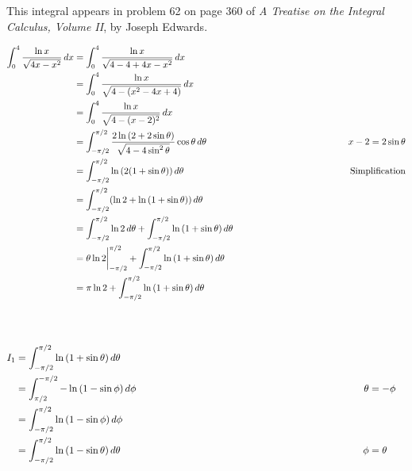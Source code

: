 \documentclass{article}
\newcommand{\explnspacei}{\hspace{1.59in}}		%
\newcommand{\explnspaceii}{\hspace{3.04in}}
\begin{document}
\noindent
This integral appears in problem 62 on page 360 of \textit{A Treatise on the Integral Calculus, Volume II}, by Joseph Edwards.
\\
\par\noindent
$\begin{aligned}
\int_0^4 \frac{\ln{x}}{\sqrt{4x - x^2}} \, dx & = \int_0^4 \frac{\ln{x}}{\sqrt{4 - 4 + 4x - x^2}} \, dx \\		%
& = \int_0^4 \frac{\ln{x}}{\sqrt{4 - (x^2 - 4x + 4)}} \, dx \\
& = \int_0^4 \frac{\ln{x}}{\sqrt{4 - (x - 2) ^ 2}} \, dx \\
& = \int_{-\pi / 2}^{\pi / 2} \frac{2 \ln{(2 + 2 \sin \theta)}}{\sqrt{4 - 4 \sin^2 \theta}} \cos \theta \, d\theta & \explnspacei x - 2 = 2 \sin \theta \\
& = \int_{-\pi / 2}^{\pi / 2} \ln{(2(1 + \sin \theta))} \, d\theta & \explnspacei \text{Simplification} \\
& = \int_{-\pi / 2}^{\pi / 2} (\ln{2} + \ln{(1 + \sin \theta)}) \, d\theta \\
& = \int_{-\pi / 2}^{\pi / 2} \ln 2 \, d\theta + \int_{-\pi / 2}^{\pi / 2} \ln{(1 + \sin \theta)} \, d\theta \\
& = \theta \ln 2 \biggr\rvert_{-\pi / 2}^{\pi / 2} + \int_{-\pi / 2}^{\pi / 2} \ln{(1 + \sin \theta)} \, d\theta \\	%
& = \pi \ln 2 + \int_{-\pi / 2}^{\pi / 2} \ln{(1 + \sin \theta)} \, d\theta
\end{aligned}$
\\ \\ \\
\par\noindent
$\begin{aligned}
I_1 & = \int_{-\pi / 2}^{\pi / 2} \ln{(1 + \sin \theta)} \, d\theta \\
& = \int_{\pi / 2}^{-\pi / 2} -\ln{(1 - \sin \phi)} \, d\phi & \explnspaceii \theta & = - \phi \\
& = \int_{-\pi / 2}^{\pi / 2} \ln{(1 - \sin \phi)} \, d\phi \\
& = \int_{-\pi / 2}^{\pi / 2} \ln{(1 - \sin \theta)} \, d\theta & \explnspaceii \phi & = \theta
\end{aligned}$
\\ \\
\par\noindent
\end{document}
